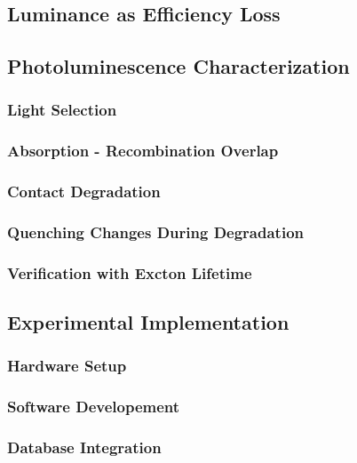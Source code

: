 \documentclass[../thesis.tex]{subfiles}
\begin{document}
\subsection{Luminance as Efficiency Loss}
\subsection{Photoluminescence Characterization}
\subsubsection{Light Selection}
\subsubsection{Absorption - Recombination Overlap}
\subsubsection{Contact Degradation}
\subsubsection{Quenching Changes During Degradation}
\subsubsection{Verification with Excton Lifetime}

\subsection{Experimental Implementation}
\subsubsection{Hardware Setup}
\subsubsection{Software Developement}
\subsubsection{Database Integration}


\end{document}
